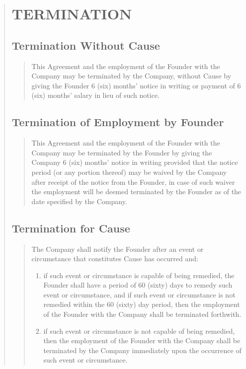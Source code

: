 \documentclass[
]{article}
\begin{document}
\begin{quote}
\section{TERMINATION}

\subsection{\textbf{Termination Without Cause}}

\begin{quote}
This Agreement and the employment of the Founder with the Company may be
terminated by the Company, without Cause by giving the Founder 6 (six)
months' notice in writing or payment of 6 (six) months' salary in lieu
of such notice.
\end{quote}

\subsection{\textbf{Termination of Employment by Founder}}

\begin{quote}
This Agreement and the employment of the Founder with the Company may be
terminated by the Founder by giving the Company 6 (six) months' notice
in writing provided that the notice period (or any portion thereof) may
be waived by the Company after receipt of the notice from the Founder,
in case of such waiver the employment will be deemed terminated by the
Founder as of the date specified by the Company.
\end{quote}

\subsection{\textbf{Termination for Cause}}

\begin{quote}
The Company shall notify the Founder after an event or circumstance that
constitutes Cause has occurred and:

\begin{enumerate}[label=(\roman*)] 
  \item if such event or circumstance is capable of being remedied, the
        Founder shall have a period of 60 (sixty) days to remedy such event or
        circumstance, and if such event or circumstance is not remedied within
        the 60 (sixty) day period, then the employment of the Founder with the
        Company shall be terminated forthwith.
  \item if such event or circumstance is not capable of being remedied, then the
        employment of the Founder with the Company shall be terminated by the
        Company immediately upon the occurrence of such event or
        circumstance.
\end{enumerate}


\end{quote}
\end{quote}
\end{document}
